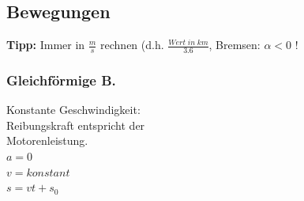 \subsection{Bewegungen}
\textbf{Tipp:} Immer in $\frac{m}{s}$ rechnen (d.h. $\frac{Wert \; in \; km}{3.6}$, 	Bremsen: $\alpha < 0$ !
\begin{multicols}{3}
	\subsubsection{Gleichförmige B.}
	Konstante Geschwindigkeit: \\
	Reibungskraft entspricht der \\
	Motorenleistung. \\
	$a = 0$ \\
	$v = konstant$\\
	$s = vt + s_0$ \\
	\\
	\\
\columnbreak

\end{multicols}
